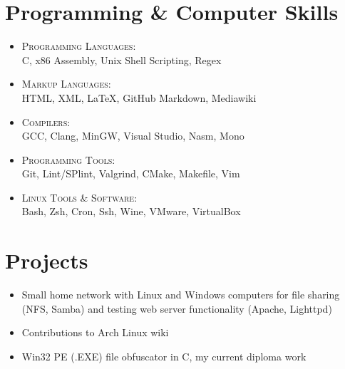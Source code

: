 \documentclass[a4paper,10pt]{article}
\begin{document}
\section{Programming \& Computer Skills}
\begin{itemize}
\item \textsc{Programming Languages}:\\
	C, x86 Assembly, Unix Shell Scripting, Regex
\item \textsc{Markup Languages}:\\
	HTML, XML, \LaTeX, GitHub Markdown, Mediawiki
\item \textsc{Compilers}:\\
	GCC, Clang, MinGW, Visual Studio, Nasm, Mono
\item \textsc{Programming Tools}:\\
	Git, Lint/SPlint, Valgrind, CMake, Makefile, Vim
\item \textsc{Linux Tools \& Software}:\\
	Bash, Zsh, Cron, Ssh, Wine, VMware, VirtualBox
\end{itemize}

\section{Projects}
\begin{itemize}
\item Small home network with Linux and Windows computers for file sharing (NFS, Samba)
and testing web server functionality (Apache, Lighttpd)
\item Contributions to Arch Linux wiki\\
{}
\item Win32 PE (.EXE) file obfuscator in C, my current diploma work\\
{}
\end{itemize}
\end{document}
